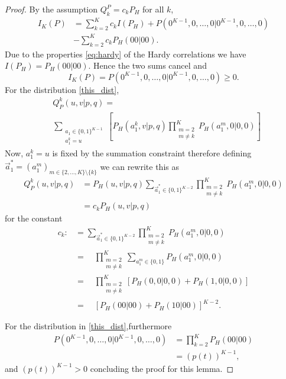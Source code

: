 \documentclass[10pt,a4paper]{amsart}
\begin{document}
\begin{proof}
    By the assumption $Q_k^P=c_k P_H$ for all $k$,
\begin{align}\nonumber
I_K(P)&=\sum_{k=2}^K c_k I(P_H)+P(0^{K-1},0,\ldots,0|0^{K-1},0,\ldots,0)\\&-\sum_{k=2}^K c_k P_H(00|00).
\end{align}
Due to the properties \eqref{eq:hardy} of the Hardy correlations we have $I(P_H)=P_H(00|00)$. Hence the two sums cancel and
\begin{equation}
I_K(P)=P(0^{K-1},0,\ldots,0|0^{K-1},0,\ldots,0)\geq 0.
\end{equation}
For the distribution \eqref{this_dist}, 
\begin{align}
    &Q^k_P(u,v|p,q) =\\& \sum_{\substack{a_1\in\{0,1\}^{K-1}\\a_1^k=u}}\left[P_H(a^k_1,v|p,q)\prod^K_{\substack{m=2\\m\neq k}}P_H(a_1^m,0|0,0)\right]\nonumber
\end{align}
Now, $a^k_1=u$ is fixed by the summation constraint therefore defining $\vec a^*_1=(a_1^m)_{m\in\{2,...,K\}\setminus \{k\}}$ we can rewrite this as
\begin{align}
    Q^k_P(u,v|p,q) &=P_H(u,v|p,q) \! \! \! \! \! \!\sum_{\vec a_1^*\in\{0,1\}^{K-2}}\prod^K_{\substack{m=2\\m\neq k}}P_H(a_1^m,0|0,0)\nonumber \\
    &= c_k P_H(u,v|p,q)
\end{align}
for the constant 
\begin{align}
    c_k :&= \sum_{\vec a_1^*\in\{0,1\}^{K-2}}\prod^K_{\substack{m=2\\m\neq k}}P_H(a_1^m,0|0,0) \\
    &= \quad \prod^K_{\substack{m=2\\m\neq k}}\sum_{a_1^m\in\{0,1\}}P_H(a_1^m,0|0,0)\\
    &= \quad \prod^K_{\substack{m=2\\m\neq k}}\left[P_H(0,0|0,0)+P_H(1,0|0,0)\right] \\
    &= \quad \left[P_H(00|00)+P_H(10|00)\right]^{K-2}.
\end{align}

For the distribution in \eqref{this_dist},furthermore
\begin{align}
P(0^{K-1},0,\ldots,0|0^{K-1},0,\ldots,0) &=  \prod_{k=2}^KP_H(00|00) \nonumber \\
&=(p(t))^{K-1}, \nonumber
\end{align}
and $(p(t))^{K-1}>0$ concluding the proof for this lemma.
\end{proof}
\end{document}
